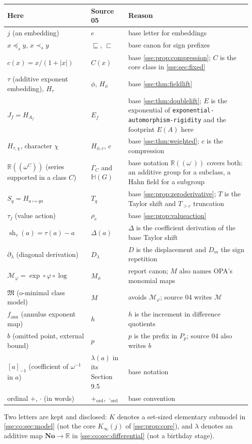 \documentclass[11pt,a4paper]{article}
\numberwithin{equation}{section}
\theoremstyle{plain}
\theoremstyle{definition}
\theoremstyle{remark}
\newcommand{\No}{\mathbf{No}}
\newcommand{\R}{\mathbb{R}}
\newcommand{\NF}[1]{\R((\omega^{#1}))}
\newcommand{\pref}{\preccurlyeq_s}
\newcommand{\spref}{\prec_s}
\newcommand{\fn}[1]{\nolinkurl{#1}}%
\newcommand{\shco}{\operatorname{sh}}%
\begin{document}
\begin{longtable}{P{40mm}P{38mm}P{72mm}}
\toprule
Here & Source 05 & Reason \\
\midrule
\endhead
$j$ (an embedding) & $e$ & base letter for embeddings \\
$x\pref y$, $x\spref y$ & $\sqsubseteq$, $\sqsubset$ & base canon for sign prefixes \\
$c(x)=x/(1+|x|)$ & $C(x)$ & base \cref{sse:prop:compression}; $C$ is the core class in \cref{sse:sec:fixed} \\
$\tau$ (additive exponent embedding), $H_\tau$ & $\phi$, $H_\phi$ & base \cref{sse:thm:fieldlift} \\
$J_f=H_{A_f}$ & $E_f$ & base \cref{sse:thm:doublelift}; $E$ is the exponential of \fn{exponential-automorphism-rigidity} and the footprint $E(A)$ here \\
$H_{\tau,\chi}$, character $\chi$ & $H_{\phi,c}$, $c$ & base \cref{sse:thm:weighted}; $c$ is the compression \\
$\NF{C}$ (series supported in a class $C$) & $\Gamma_C$ and $\mathbb H(G)$ & base notation $\NF{\cdot}$ covers both: an additive group for a subclass, a Hahn field for a subgroup \\
$S_q=H_{a\mapsto qa}$ & $T_q$ & base \cref{sse:prop:zeroderivative}; $T$ is the Taylor shift and $T_{>c}$ truncation \\
$\tau_j$ (value action) & $\rho_e$ & base \cref{sse:prop:valueaction} \\
$\shco_\tau(a)=\tau(a)-a$ & $\Delta(a)$ & $\Delta$ is the coefficient derivation of the base Taylor shift \\
$\partial_\lambda$ (diagonal derivation) & $D_\lambda$ & $D$ is the displacement and $D_m$ the sign repetition \\
$\mathcal M_\varphi=\exp\circ\varphi\circ\log$ & $M_\phi$ & report canon; $M$ also names OPA's monomial maps \\
$\mathfrak M$ (o-minimal class model) & $M$ & avoids $\mathcal M_\varphi$; source 04 writes $\mathcal M$ \\
$f_{\mathrm{ann}}$ (annulus exponent map) & $h$ & $h$ is the increment in difference quotients \\
$b$ (omitted point, external bound) & $p$ & $p$ is the prefix in $P_p$; source 04 also writes $b$ \\
$[a]_{-1}$ (coefficient of $\omega^{-1}$ in $a$) & $\lambda(a)$ in its Section 9.5 & base notation \\
ordinal $+$, $\cdot$ (in words) & $+_{\mathrm{ord}}$, $\cdot_{\mathrm{ord}}$ & base convention \\
\bottomrule
\end{longtable}
Two letters are kept and disclosed: $K$ denotes a set-sized elementary
submodel in \cref{sse:co:sec:model} (not the core $K_\infty(j)$ of
\cref{sse:prop:core}), and $\lambda$ denotes an additive map $\No\to\R$ in
\cref{sse:co:sec:differential} (not a birthday stage).
\end{document}
